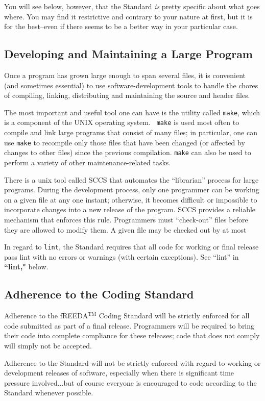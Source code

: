 You will see below, however, that the Standard {\em is} pretty
specific about what goes where.  You may find it restrictive and
contrary to your nature at first, but it is for the best--even if
there seems to be a better way in your particular case.

\subsection{Developing and Maintaining a Large Program}
Once a program has grown large enough to span several files, it is
convenient (and sometimes essential) to use software-development tools
to handle the chores of compiling, linking, distributing and
maintaining the source and header files.

The most important and useful tool one can have is the utility called
{\tt make}, which is a component of the UNIX operating system.  {\tt
make} is used most often to compile and link large programs that
consist of many files; in particular, one can use {\tt make} to
recompile only those files that have been changed (or affected by
changes to other files) since the previous compilation.  {\tt make}
can also be used to perform a variety of other maintenance-related
tasks.

There is a unix tool called SCCS that automates the ``librarian''
process for large programs.  During the development process, only one
programmer can be working on a given file at any one instant;
otherwise, it becomes difficult or impossible to incorporate changes
into a new release of the program.  SCCS provides a reliable mechanism
that enforces this rule.  Programmers must ``check-out'' files before
they are allowed to modify them.  A given file may be checked out by
at most

In regard to {\tt lint}, the Standard requires that all code for
working or final release pass lint with no errors or warnings (with
certain exceptions).  See ``lint'' in {\bf ``lint,"} below.

\subsection{Adherence to the Coding Standard}
Adherence to the fREEDA$^{\mathrm{TM}}$ Coding Standard will be strictly enforced for
all code submitted as part of a final release.  Programmers will be
required to bring their code into complete compliance for these
releases; code that does not comply will simply not be accepted.

Adherence to the Standard will not be strictly enforced with regard to
working or development releases of software, especially when there is
significant time pressure involved...but of course everyone is
encouraged to code according to the Standard whenever possible.

